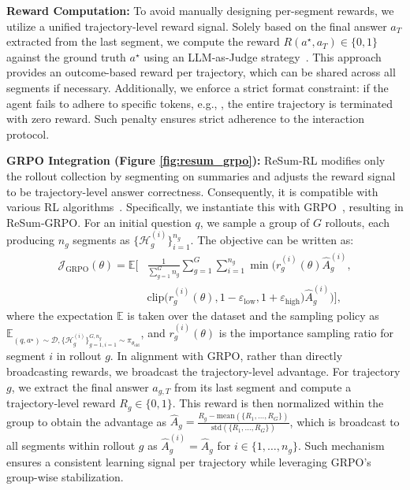 \textbf{Reward Computation:} To avoid manually designing per-segment rewards, we utilize a unified trajectory-level reward signal. Solely based on the final answer $a_T$ extracted from the last segment, we compute the reward $R(a^{\star}, a_T) \in \{0,1\}$ against the ground truth $a^{\star}$ using an LLM-as-Judge strategy~\citep{gu2024survey, li2024llmsasjudgescomprehensivesurveyllmbased}. This approach provides an outcome-based reward per trajectory, which can be shared across all segments if necessary. Additionally, we enforce a strict format constraint: if the agent fails to adhere to specific tokens, e.g., \lightthink{}, the entire trajectory is terminated with zero reward. Such penalty ensures strict adherence to the interaction protocol.

\textbf{GRPO Integration (Figure \ref{fig:resum_grpo}):} ReSum‑RL modifies only the rollout collection by segmenting on summaries and adjusts the reward signal to be trajectory-level answer correctness. Consequently, it is compatible with various RL algorithms~\citep{ppo,rlhf,yu2025dapo}. Specifically, we instantiate this with GRPO~\citep{shao2024deepseekmath}, resulting in ReSum‑GRPO. For an initial question $q$, we sample a group of $G$ rollouts, each producing $n_g$ segments as $\{\mathcal{H}_g^{(i)}\}_{i=1}^{n_g}$. The objective can be written as:
\begin{equation*}
\label{eq:grpo}
\begin{aligned}
\mathcal{J}_{\text{GRPO}}(\theta) = \mathbb{E} \Bigg[ & \frac{1}{\sum_{g=1}^{G}n_g} \sum_{g=1}^{G}\sum_{i=1}^{n_g} \min \bigg(  r_g^{(i)}(\theta) \hat{A}_g^{(i)}, \\
& \text{clip}\big(r_g^{(i)}(\theta), 1-\varepsilon_{\text{low}}, 1+\varepsilon_{\text{high}}\big) \hat{A}_g^{(i)} \bigg) \Bigg],
\end{aligned}
\end{equation*}
where the expectation $\mathbb{E}$ is taken over the dataset and the sampling policy as $\mathbb{E}_{(q,a^{\star}) \sim \mathcal{D},  \{ \mathcal{H}_{g}^{(i)} \}_{g=1, i=1}^{G, n_g} \sim \pi_{\theta_{\text{old}}} }$, and $r_g^{(i)}(\theta)$ is the importance sampling ratio for segment $i$ in rollout $g$. In alignment with GRPO, rather than directly broadcasting rewards, we broadcast the trajectory-level advantage. For trajectory $g$, we extract the final answer $a_{g, T}$ from its last segment and compute a trajectory‑level reward $R_g \in \{0,1\}$. This reward is then normalized within the group to obtain the advantage as $\hat{A}_g = \frac{R_g - \text{mean}(\{R_1,\dots,R_G\})}{\text{std}(\{R_1,\dots,R_G\})}$, which is broadcast to all segments within rollout $g$ as $\hat{A}_g^{(i)} = \hat{A}_g$ for $i \in \{ 1,\dots,n_g \}$. Such mechanism ensures a consistent learning signal per trajectory while leveraging GRPO’s group-wise stabilization.

